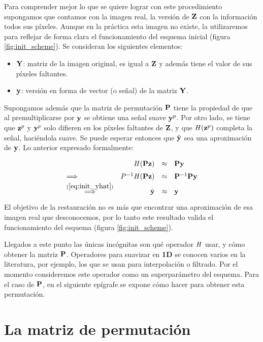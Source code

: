 Para comprender mejor lo que se quiere lograr con este procedimiento supongamos que contamos con la imagen real, la versi\'on de $\Z$ con la informaci\'on todos sus p\'ixeles. Aunque en la pr\'actica esta imagen no existe, la utilizaremos para reflejar de forma clara el funcionamiento del esquema inicial (figura \ref{fig:init_scheme}). Se consideran los siguientes elementos:
\begin{itemize}
	\item $\Y$: matriz de la imagen original, es igual a $\Z$ y adem\'as tiene el valor de sus p\'ixeles faltantes. 
	\item $\y$: versión en forma de vector (o señal) de la matriz $\Y$.
\end{itemize}
Supongamos adem\'as que la matriz de permutaci\'on $\P$ tiene la propiedad de que al premultiplicarse por $\y$ se obtiene una señal suave $\y^p$. Por otro lado, se tiene que $\z^p$ y $\y^p$ solo difieren en los p\'ixeles faltantes de $\Z$, y que $\H(\z^p)$ completa la señal, haciéndola suave. Se puede esperar entonces que $\yhat$ sea una aproximaci\'on de $\y$. Lo anterior expresado formalmente:
\begin{equation}
	\def\arraystretch{1.5}
	\begin{array}{lrcl}
		                                           &     \H (\P\z ) &\approx& \P\y        \\ 
		\Longrightarrow                            & P^{-1}\H(\P\z) &\approx& \P^{-1}\P\y \\
		\overset{(\ref{eq:init_yhat})}{\Longrightarrow} &          \yhat &\approx& \y          \\
	\end{array}
	\label{eq:permutation_smoothness}
\end{equation}
El objetivo de la restauraci\'on no es m\'as que encontrar una aproximaci\'on de esa imagen real que desconocemos, por lo tanto este resultado valida el funcionamiento del esquema (figura \ref{fig:init_scheme}).

Llegados a este punto las únicas incógnitas son qu\'e operador $\H$ usar, y c\'omo obtener la matriz $\P$. Operadores para suavizar en \textbf{1D} se conocen varios en la literatura, por ejemplo, los que se usan para interpolaci\'on o filtrado. Por el momento consideremos este operador como un superpar\'ametro del esquema. Para el caso de $\P$, en el siguiente ep\'igrafe se expone c\'omo hacer para obtener esta permutaci\'on.

\section{La matriz de permutaci\'on}

